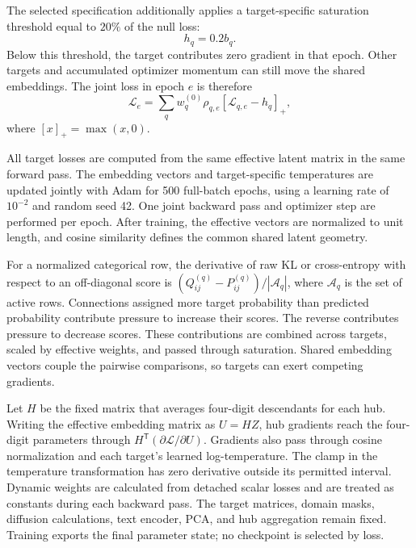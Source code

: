 \documentclass[9pt,twoside]{pnas-new}
\begin{document}
The selected specification additionally applies a target-specific saturation
threshold equal to \(20\%\) of the null loss:
\begin{equation}
h_q=0.2b_q.
\label{eq:saturation-threshold}
\end{equation}
Below this threshold, the target contributes zero gradient in that epoch. Other targets and accumulated optimizer momentum can still move the shared embeddings. The joint loss in epoch \(e\) is therefore
\begin{equation}
\mathcal{L}_e
=
\sum_q
w^{(0)}_q
\rho_{q,e}
\left[
\mathcal{L}_{q,e}-h_q
\right]_+,
\label{eq:joint-loss}
\end{equation}
where \([x]_+=\max(x,0)\).

All target losses are computed from the same effective latent matrix in the
same forward pass. The embedding vectors and target-specific temperatures
are updated jointly with Adam for 500 full-batch epochs, using a learning
rate of \(10^{-2}\) and random seed 42. One joint backward pass and optimizer
step are performed per epoch. After training, the effective vectors are
normalized to unit length, and cosine similarity defines the common
shared latent geometry.

For a normalized categorical row, the derivative of raw KL or cross-entropy with respect to an off-diagonal score is $(Q^{(q)}_{ij}-P^{(q)}_{ij})/|\mathcal A_q|$, where $\mathcal A_q$ is the set of active rows. Connections assigned more target probability than predicted probability contribute pressure to increase their scores. The reverse contributes pressure to decrease scores. These contributions are combined across targets, scaled by effective weights, and passed through saturation. Shared embedding vectors couple the pairwise comparisons, so targets can exert competing gradients.

Let $H$ be the fixed matrix that averages four-digit descendants for each hub. Writing the effective embedding matrix as $U=HZ$, hub gradients reach the four-digit parameters through $H^{\mathsf T}(\partial\mathcal L/\partial U)$. Gradients also pass through cosine normalization and each target's learned log-temperature. The clamp in the temperature transformation has zero derivative outside its permitted interval. Dynamic weights are calculated from detached scalar losses and are treated as constants during each backward pass. The target matrices, domain masks, diffusion calculations, text encoder, PCA, and hub aggregation remain fixed. Training exports the final parameter state; no checkpoint is selected by loss.
\end{document}
